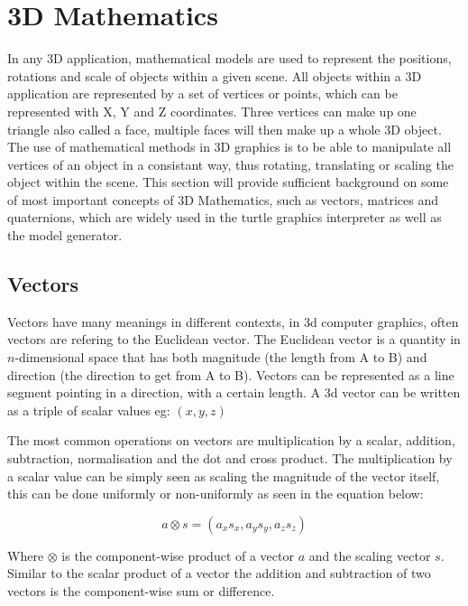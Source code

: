 \section{3D Mathematics}

In any 3D application, mathematical models are used to represent the positions, rotations and scale of objects within a given scene. All objects within a 3D application are represented by a set of vertices or points, which can be represented with X, Y and Z coordinates. Three vertices can make up one triangle also called a face, multiple faces will then make up a whole 3D object. The use of mathematical methods in 3D graphics is to be able to manipulate all vertices of an object in a consistant way, thus rotating, translating or scaling the object within the scene. This section will provide sufficient background on some of most important concepts of 3D Mathematics, such as vectors, matrices and quaternions, which are widely used in the turtle graphics interpreter as well as the model generator.

\subsection{Vectors}

Vectors have many meanings in different contexts, in \acrshort{3d} computer graphics, often vectors are refering to the Euclidean vector. The Euclidean vector is a quantity in $n$-dimensional space that has both magnitude (the length from A to B) and direction (the direction to get from A to B). Vectors can be represented as a line segment pointing in a direction, with a certain length. A \acrshort{3d} vector can be written as a triple of scalar values eg: $(x, y, z)$

The most common operations on vectors are multiplication by a scalar, addition, subtraction, normalisation and the dot and cross product. The multiplication by a scalar value can be simply seen as scaling the magnitude of the vector itself, this can be done uniformly or non-uniformly as seen in the equation below:

\begin{equation}
a \otimes s = (a_x s_x, a_y s_y, a_z s_z)
\end{equation}

\noindent
Where $\otimes$ is the component-wise product of a vector $a$ and the scaling vector $s$. Similar to the scalar product of a vector the addition and subtraction of two vectors is the component-wise sum or difference. 

